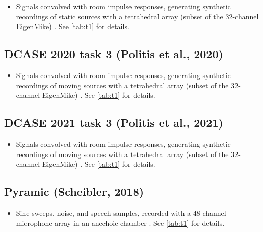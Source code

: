 \documentclass[14pt, legalpaper]{extarticle}
\begin{document}
\begin{itemize}

\item Signals convolved with room impulse responses, generating synthetic recordings of static sources with a tetrahedral array (subset of the 32-channel EigenMike) \cite{adavanne2019multi}. See \ref{tab:t1} for details.

\end{itemize}

\subsection{DCASE 2020 task 3 (Politis et al., 2020)}

\begin{itemize}

\item Signals convolved with room impulse responses, generating synthetic recordings of moving sources with a tetrahedral array (subset of the 32-channel EigenMike) \cite{politis2020dataset}. See \ref{tab:t1} for details.

\end{itemize}

\subsection{DCASE 2021 task 3 (Politis et al., 2021)}

\begin{itemize}

\item Signals convolved with room impulse responses, generating synthetic recordings of moving sources with a tetrahedral array (subset of the 32-channel EigenMike) \cite{politis2021tau}. See \ref{tab:t1} for details.

\end{itemize}

\subsection{Pyramic (Scheibler, 2018)}

\begin{itemize}

\item Sine sweeps, noise, and speech samples, recorded with a 48-channel microphone array in an anechoic chamber \cite{scheibler2018pyramic}. See \ref{tab:t1} for details.

\end{itemize}
\end{document}
